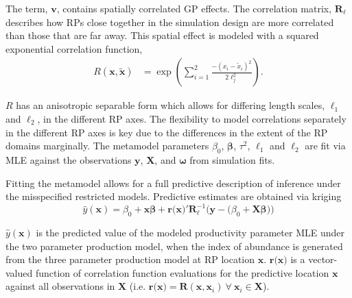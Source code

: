 The term, $\bm{v}$, contains spatially correlated GP effects. The correlation 
matrix, $\bm{R_{\ell}}$ describes how RPs close together in the simulation design 
are more correlated than those that are far away. This spatial effect is modeled 
with a squared exponential correlation function,
%
\begin{align}   \label{corModel}
R(\bm{x}, \bm{\tilde x}) &= \exp\left( \sum_{i=1}^2 \frac{-(x_{i}-\tilde x_{i})^2}{2\ell_j^2} \right). 
\end{align}

$R$ has an anisotropic separable form which allows for differing length scales, 
$\ell_1$ and $\ell_2$, in the different RP axes. The flexibility to model 
correlations separately in the different RP axes is key due to the differences 
in the extent of the RP domains marginally. 
The metamodel parameters $\beta_0$, $\bm{\beta}$, $\tau^2$,
$\ell_1$ and $\ell_2$ are fit via MLE against the observations $\textbf{y}$, $\bm{X}$,
and $\bm{\omega}$ from simulation fits.

%
Fitting the metamodel allows for a full predictive description of inference 
under the misspecified restricted models.
Predictive estimates are obtained via kriging  %
\begin{equation} %
	\hat y(\textbf{x}) = \beta_0 + \textbf{x}\bm{\beta} + \textbf{r(x)}'\bm{R}^{-1}_{\bm{\ell}}\Big(\textbf{y}-\big(\beta_0+\bm{X}\bm{\beta}\big)\Big)
\end{equation}

%
$\hat y(\textbf{x})$ is the predicted value of the modeled productivity parameter 
MLE under the two parameter production model, when the index of abundance %
is generated from the three parameter production model at RP location $\textbf{x}$. 
$\textbf{r(x)}$ is a vector-valued function of correlation function evaluations for the 
predictive location $\textbf{x}$ against all observations in $\bm{X}$ 
(i.e. $\textbf{r(x)}=\bm{R}(\textbf{x}, \bm{x}_i)~\forall~\bm{x}_i\in\bm{X}$).


